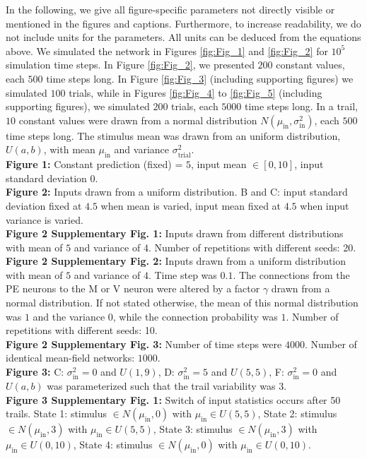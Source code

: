 \documentclass[10pt,a4paper,draft]{article}
\begin{document}
In the following, we give all figure-specific parameters not directly visible or mentioned in the figures and captions. Furthermore, to increase readability, we do not include units for the parameters. All units can be deduced from the equations above. We simulated the network in Figures \ref{fig:Fig_1} and \ref{fig:Fig_2} for $10^5$ simulation time steps. In Figure \ref{fig:Fig_2}, we presented $200$ constant values, each $500$ time steps long. In Figure \ref{fig:Fig_3} (including supporting figures) we simulated $100$ trials, while in Figures \ref{fig:Fig_4} to \ref{fig:Fig_5} (including supporting figures), we simulated $200$ trials, each $5000$ time steps long. In a trail, $10$ constant values were drawn from a normal distribution $N(\mu_\mathrm{in}, \sigma^2_\mathrm{in})$, each $500$ time steps long. The stimulus mean was drawn from an uniform distribution, $U(a, b)$, with mean $\mu_\mathrm{in}$ and variance $\sigma^2_\mathrm{trial}$.\newline\\ 
%
\textbf{Figure 1:} Constant prediction (fixed) = $5$, input mean $\in [0,10]$, input standard deviation $0$.\\
%
\textbf{Figure 2:} Inputs drawn from a uniform distribution. B and C: input standard deviation fixed at $4.5$ when mean is varied, input mean fixed at $4.5$ when input variance is varied.\\
%
\textbf{Figure 2 Supplementary Fig. 1:} Inputs drawn from different distributions with mean of $5$ and variance of $4$. Number of repetitions with different seeds: 20.\\
%
\textbf{Figure 2 Supplementary Fig. 2:} Inputs drawn from a uniform distribution with mean of $5$ and variance of $4$. Time step was $0.1$. The connections from the PE neurons to the M or V neuron were altered by a factor $\gamma$ drawn from a normal distribution. If not stated otherwise, the mean of this normal distribution was $1$ and the variance $0$, while the connection probability was $1$. Number of repetitions with different seeds: 10.\\
%
\textbf{Figure 2 Supplementary Fig. 3:} Number of time steps were $4000$. Number of identical mean-field networks: $1000$. \\
%
\textbf{Figure 3:} C: $\sigma^2_\mathrm{in} = 0$ and $U(1,9)$, D:  $\sigma^2_\mathrm{in} = 5$ and $U(5,5)$, F: $\sigma^2_\mathrm{in} = 0$ and $U(a,b)$ was parameterized such that the trail variability was $3$.\\
%
\textbf{Figure 3 Supplementary Fig. 1:}  Switch of input statistics occurs after 50 trails. State 1: stimulus $\in N(\mu_\mathrm{in}, 0)$ with $\mu_\mathrm{in} \in U(5,5)$, State 2:  stimulus $\in N(\mu_\mathrm{in}, 3)$ with $\mu_\mathrm{in} \in U(5,5)$, State 3: stimulus $\in N(\mu_\mathrm{in}, 3)$ with $\mu_\mathrm{in} \in U(0,10)$, State 4: stimulus $\in N(\mu_\mathrm{in}, 0)$ with $\mu_\mathrm{in} \in U(0,10)$.\\
\end{document}
